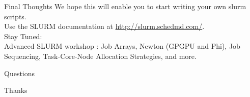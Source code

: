 \documentclass[10pt,compress]{beamer}
\begin{document}
\begin{frame}{Final Thoughts}
We hope this will enable you to start writing your own slurm scripts.
\pause \\
\bigskip
Use the SLURM documentation at \url{http://slurm.schedmd.com/}.\\
\pause
\bigskip
Stay Tuned: \\ Advanced SLURM workshop : Job Arrays, Newton (GPGPU and Phi), Job Sequencing, Task-Core-Node Allocation Strategies, and more.\\

\end{frame}
\begin{frame}{Questions}
\end{frame}

\begin{frame}{Thanks}
\end{frame}



\end{document}

